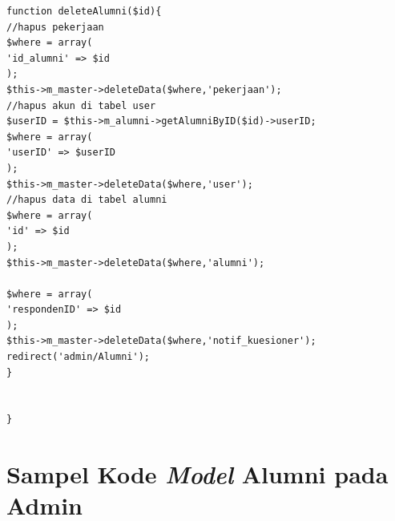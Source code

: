 \begin{verbatim}
function deleteAlumni($id){
//hapus pekerjaan
$where = array(
'id_alumni' => $id
);
$this->m_master->deleteData($where,'pekerjaan');
//hapus akun di tabel user
$userID = $this->m_alumni->getAlumniByID($id)->userID;
$where = array(
'userID' => $userID
);
$this->m_master->deleteData($where,'user');
//hapus data di tabel alumni
$where = array(
'id' => $id
);
$this->m_master->deleteData($where,'alumni');

$where = array(
'respondenID' => $id
);
$this->m_master->deleteData($where,'notif_kuesioner');
redirect('admin/Alumni');
}


}

\end{verbatim}



\chapter{Sampel Kode \textit{Model} Alumni pada Admin}


